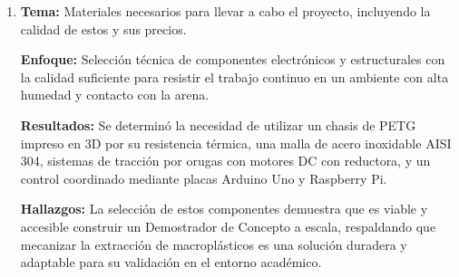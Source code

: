 \documentclass[12pt]{article}
\begin{document}
\begin{enumerate}
\textbf{Enfoque:} Evaluación de la factibilidad técnica para aplicar distintas tecnologías y programación frente a soluciones de mecánica tradicional.

\textbf{Resultados:} Se comprobó que la implementación de Inteligencia Artificial presenta altas complejidades y barreras técnicas de programación durante la investigación del proyecto.

\textbf{Hallazgos:} Esta información respalda que, para solucionar eficientemente la recolección de macroplásticos, la ingeniería del robot no debe depender de una Inteligencia Artificial compleja, sino que debe enfocarse en mecanizar la limpieza mediante una electrónica estable que coordine un mecanismo de filtrado directo.

\textbf{Fuentes:}
\begin{itemize}
\item Cañón, H. (2021). \textit{Propuesta de un método tecnológico de recolección de desechos usando cribadoras de arena}.
\item BeachTech. (2020). \textit{Limpieza profesional de playas}. \url{https://www.beach-tech.com}
\item Umibeach Robótica. (2025). \textit{UmiBeach: robot autónomo eléctrico para limpieza de playas}.
\item García-Domínguez, R., et al. (2021). \textit{Modelo integral de la estructura móvil de una máquina limpiaplaya}.
\item Wikipedia. (2021). \textit{Limpieza de playas}. \url{https://es.wikipedia.org/wiki/Limpieza_de_playas}
\end{itemize}

\item \textbf{Tema:} Materiales necesarios para llevar a cabo el proyecto, incluyendo la calidad de estos y sus precios.

\textbf{Enfoque:} Selección técnica de componentes electrónicos y estructurales con la calidad suficiente para resistir el trabajo continuo en un ambiente con alta humedad y contacto con la arena.

\textbf{Resultados:} Se determinó la necesidad de utilizar un chasis de PETG impreso en 3D por su resistencia térmica, una malla de acero inoxidable AISI 304, sistemas de tracción por orugas con motores DC con reductora, y un control coordinado mediante placas Arduino Uno y Raspberry Pi.

\textbf{Hallazgos:} La selección de estos componentes demuestra que es viable y accesible construir un Demostrador de Concepto a escala, respaldando que mecanizar la extracción de macroplásticos es una solución duradera y adaptable para su validación en el entorno académico.


\end{enumerate}
\end{document}
